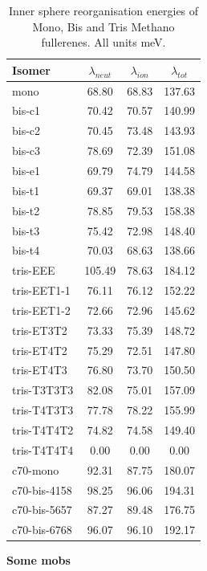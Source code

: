 \documentclass[journal=nanofd,manuscript=suppinfo]{achemso}
\begin{document}
\begin{table}
\centering
\begin{tabular}{lSSS}
\toprule
Isomer & $\lambda_{neut}$ & $\lambda_{ion}$ & $\lambda_{tot}$ \\
\midrule
mono & 68.80 & 68.83 & 137.63 \\
\midrule
bis-c1 & 70.42 & 70.57 & 140.99 \\
bis-c2 & 70.45 & 73.48 & 143.93 \\
bis-c3 & 78.69 & 72.39 & 151.08 \\
bis-e1 & 69.79 & 74.79 & 144.58 \\
bis-t1 & 69.37 & 69.01 & 138.38 \\
bis-t2 & 78.85 & 79.53 & 158.38 \\
bis-t3 & 75.42 & 72.98 & 148.40 \\
bis-t4 & 70.03 & 68.63 & 138.66 \\
\midrule
tris-EEE & 105.49 & 78.63 & 184.12 \\
tris-EET1-1 & 76.11 & 76.12 & 152.22 \\
tris-EET1-2 & 72.66 & 72.96 & 145.62 \\
tris-ET3T2 & 73.33 & 75.39 & 148.72 \\
tris-ET4T2 & 75.29 & 72.51 & 147.80 \\
tris-ET4T3 & 76.80 & 73.70 & 150.50 \\
tris-T3T3T3 & 82.08 & 75.01 & 157.09 \\
tris-T4T3T3 & 77.78 & 78.22 & 155.99 \\
tris-T4T4T2 & 74.82 & 74.58 & 149.40 \\
tris-T4T4T4 & 0.00 & 0.00 & 0.00 \\
\midrule
c70-mono & 92.31 & 87.75 & 180.07 \\
c70-bis-4158 & 98.25 & 96.06 & 194.31 \\
c70-bis-5657 & 87.27 & 89.48 & 176.75 \\
c70-bis-6768 & 96.07 & 96.10 & 192.17 \\
\bottomrule
\end{tabular}
\caption{\label{tab:Lambda}
Inner sphere reorganisation energies of Mono, Bis and Tris Methano fullerenes. All units meV.}
\end{table}




\textbf{Some mobs}
\end{document}
